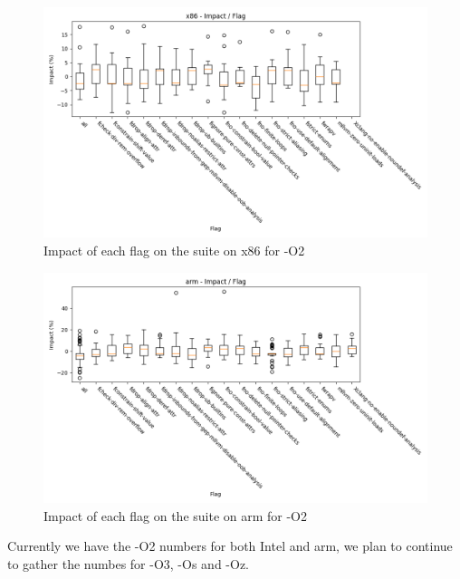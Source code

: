 \begin{figure}[H]
  \centering
  \includegraphics[scale=0.6]{x86_impact_per_flag}
  \caption{Impact of each flag on the suite on x86 for -O2}
  \label{fig:x86_impact_per_flag}
\end{figure}

\begin{figure}[H]
  \centering
  \includegraphics[scale=0.6]{arm_impact_per_flag}
  \caption{Impact of each flag on the suite on arm for -O2}
  \label{fig:arm_impact_per_flag}
\end{figure}

Currently we have the -O2 numbers for both Intel and arm, we plan to continue to
gather the numbes for -O3, -Os and -Oz.
